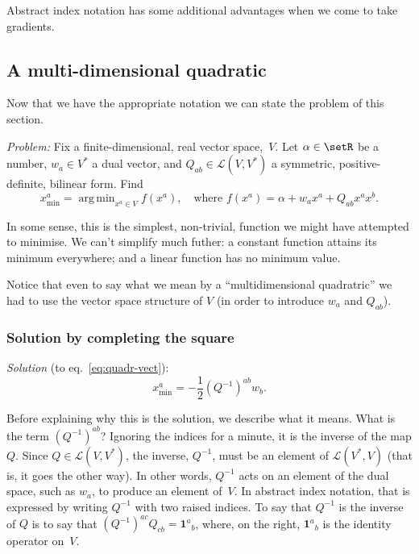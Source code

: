 \documentclass[10pt, a4paper]{article}
\newcommand{\id}{\mathbold{1}}
\DeclareMathOperator*{\argmin}{arg\,min}
\begin{document}
Abstract index notation has some additional advantages when we come to
take gradients.

\subsection{A multi-dimensional quadratic}

Now that we have the appropriate notation we can state the problem of
this section.

\emph{Problem:} Fix a finite-dimensional, real vector space,~$V$. Let
$\alpha\in\setR$ be a number, $w_a\in V^*$ a dual vector, and
$Q_{ab} \in \mathcal{L}(V,V^*)$ a symmetric, positive-definite, bilinear
form. Find 
\begin{equation}
x^a_\text{min} = \argmin_{x^a\in V} f(x^a),\quad\text{where $f(x^a) = \alpha + w_ax^a + Q_{ab}x^ax^b$}.
\label{eq:quadr-vect}
\end{equation}

In some sense, this is the simplest, non-trivial, function we might
have attempted to minimise. We can't simplify much futher: a constant
function attains its minimum everywhere; and a linear function has no
minimum value.

Notice that even to say what we mean by a “multidimensional
quadratric” we had to use the vector space structure of $V$ (in order
to introduce $w_a$ and $Q_{ab}$).

\subsubsection{Solution by completing the square}

\emph{Solution} (to eq.~\eqref{eq:quadr-vect}):
\begin{equation}
  x^a_\text{min} = -\frac{1}{2} {(Q^{-1})}^{ab}w_b.
\label{eq:sol-quadr-vect}
\end{equation}

Before explaining why this is the solution, we describe what it
means. What is the term ${(Q^{-1})}^{ab}$? Ignoring the indices for a
minute, it is the inverse of the map $Q$. Since
$Q\in\mathcal{L}(V, V^*)$, the inverse, $Q^{-1}$, must be an element of
$\mathcal{L}(V^*, V)$ (that is, it goes the other way). In other words,
$Q^{-1}$ acts on an element of the dual space, such as $w_a$, to
produce an element of~$V$. In abstract index notation, that is
expressed by writing $Q^{-1}$ with two raised indices. To say that
$Q^{-1}$ is the inverse of $Q$ is to say that
${(Q^{-1})}^{ac}Q_{cb} = \id^a{}_b$, where, on the right, $\id^a{}_b$
is the identity operator on~$V$.
\end{document}
